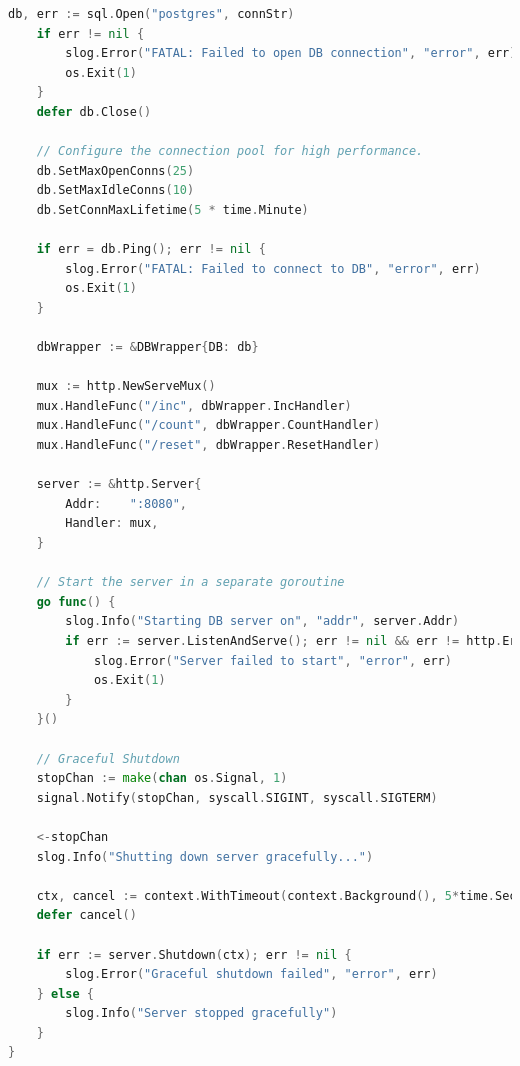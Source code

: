 \documentclass[12pt,a4paper]{article}
\begin{document}
\begin{lstlisting}[language=Go]
	db, err := sql.Open("postgres", connStr)
	if err != nil {
		slog.Error("FATAL: Failed to open DB connection", "error", err)
		os.Exit(1)
	}
	defer db.Close()

	// Configure the connection pool for high performance.
	db.SetMaxOpenConns(25)
	db.SetMaxIdleConns(10)
	db.SetConnMaxLifetime(5 * time.Minute)

	if err = db.Ping(); err != nil {
		slog.Error("FATAL: Failed to connect to DB", "error", err)
		os.Exit(1)
	}

	dbWrapper := &DBWrapper{DB: db}

	mux := http.NewServeMux()
	mux.HandleFunc("/inc", dbWrapper.IncHandler)
	mux.HandleFunc("/count", dbWrapper.CountHandler)
	mux.HandleFunc("/reset", dbWrapper.ResetHandler)

	server := &http.Server{
		Addr:    ":8080",
		Handler: mux,
	}

	// Start the server in a separate goroutine
	go func() {
		slog.Info("Starting DB server on", "addr", server.Addr)
		if err := server.ListenAndServe(); err != nil && err != http.ErrServerClosed {
			slog.Error("Server failed to start", "error", err)
			os.Exit(1)
		}
	}()

	// Graceful Shutdown
	stopChan := make(chan os.Signal, 1)
	signal.Notify(stopChan, syscall.SIGINT, syscall.SIGTERM)

	<-stopChan
	slog.Info("Shutting down server gracefully...")

	ctx, cancel := context.WithTimeout(context.Background(), 5*time.Second)
	defer cancel()

	if err := server.Shutdown(ctx); err != nil {
		slog.Error("Graceful shutdown failed", "error", err)
	} else {
		slog.Info("Server stopped gracefully")
	}
}

\end{lstlisting}
\end{document}
